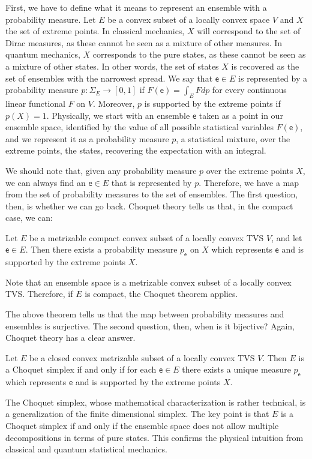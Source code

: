 \documentclass[10pt,twocolumn, nofootinbib]{revtex4-2}
\newcommand{\ens}[1][e] {\mathsf{#1}} %
\begin{document}
First, we have to define what it means to represent an ensemble with a probability measure. Let $E$ be a convex subset of a locally convex space $V$ and $X$ the set of extreme points. In classical mechanics, $X$ will correspond to the set of Dirac measures, as these cannot be seen as a mixture of other measures. In quantum mechanics, $X$ corresponds to the pure states, as these cannot be seen as a mixture of other states. In other words, the set of states $X$ is recovered as the set of ensembles with the narrowest spread. We say that $\ens \in E$ is represented by a probability measure $p : \Sigma_{E} \to [0,1]$ if $F(\ens) = \int_E F dp$ for every continuous linear functional $F$ on $V$. Moreover, $p$ is supported by the extreme points if $p(X) = 1$. Physically, we start with an ensemble $\ens$ taken as a point in our ensemble space, identified by the value of all possible statistical variables $F(\ens)$, and we represent it as a probability measure $p$, a statistical mixture, over the extreme points, the states, recovering the expectation with an integral.

We should note that, given any probability measure $p$ over the extreme points $X$, we can always find an $\ens \in E$ that is represented by $p$. Therefore, we have a map from the set of probability measures to the set of ensembles. The first question, then, is whether we can go back. Choquet theory tells us that, in the compact case, we can:
\begin{thrm}[Choquet 1]
	Let $E$ be a metrizable compact convex subset of a locally convex TVS $V$, and let $\ens \in E$. Then there exists a probability measure $p_{\ens}$ on $X$ which represents $\ens$ and is supported by the extreme points $X$.
\end{thrm}
Note that an ensemble space is a metrizable convex subset of a locally convex TVS. Therefore, if $E$ is compact, the Choquet theorem applies.

The above theorem tells us that the map between probability measures and ensembles is surjective. The second question, then, when is it bijective? Again, Choquet theory has a clear answer.
\begin{thrm}[Choquet 2]
	Let $E$ be a closed convex metrizable subset of a locally convex TVS $V$. Then $E$ is a Choquet simplex if and only if for each $\ens \in E$ there exists a unique measure $p_{\ens}$ which represents $\ens$ and is supported by the extreme points $X$.
\end{thrm}
The Choquet simplex, whose mathematical characterization is rather technical, is a generalization of the finite dimensional simplex. The key point is that $E$ is a Choquet simplex if and only if the ensemble space does not allow multiple decompositions in terms of pure states. This confirms the physical intuition from classical and quantum statistical mechanics.
\end{document}
